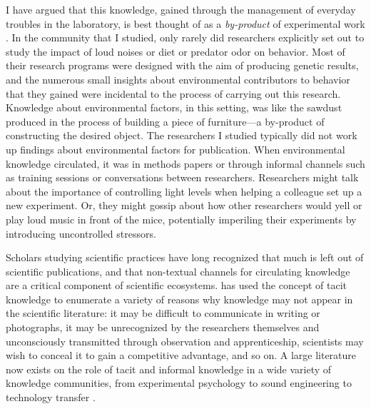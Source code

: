 \documentclass[twocolumn, serif, meta, authordate]{jote-article}
\begin{document}
I have argued that this knowledge, gained through the management of everyday troubles in the laboratory, is best thought of as a \emph{by-product} of experimental work \parencite{Nelson2018}. In the community that I studied, only rarely did researchers explicitly set out to study the impact of loud noises or diet or predator odor on behavior. Most of their research programs were designed with the aim of producing genetic results, and the numerous small insights about environmental contributors to behavior that they gained were incidental to the process of carrying out this research. Knowledge about environmental factors, in this setting, was like the sawdust produced in the process of building a piece of furniture---a by-product of constructing the desired object. The researchers I studied typically did not work up findings about environmental factors for publication. When environmental knowledge circulated, it was in methods papers or through informal channels such as training sessions or conversations between researchers. Researchers might talk about the importance of controlling light levels when helping a colleague set up a new experiment. Or, they might gossip about how other researchers would yell or play loud music in front of the mice, potentially imperiling their experiments by introducing uncontrolled stressors.

Scholars studying scientific practices have long recognized that much is left out of scientific publications, and that non-textual channels for circulating knowledge are a critical component of scientific ecosystems. \textcite{Collins1974, Collins1992a, Collins2001, Collins2010} has used the concept of tacit knowledge to enumerate a variety of reasons why knowledge may not appear in the scientific literature: it may be difficult to communicate in writing or photographs, it may be unrecognized by the researchers themselves and unconsciously transmitted through observation and apprenticeship, scientists may wish to conceal it to gain a competitive advantage, and so on. A large literature now exists on the role of tacit and informal knowledge in a wide variety of knowledge communities, from experimental psychology \parencite{Brenninkmeijer2019} to sound engineering \parencite{Horning2004} to technology transfer \parencite{Grimpe2013}.
\end{document}
